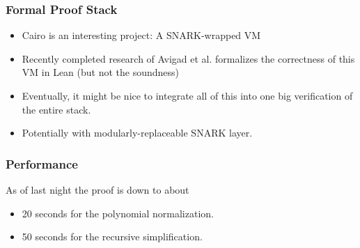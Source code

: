 \documentclass{beamer}
\begin{document}
\begin{frame}
    \frametitle{Formal Proof Stack}

    \begin{itemize}
        \item Cairo is an interesting project: A SNARK-wrapped VM

        \item Recently completed research of Avigad et al. formalizes the correctness of this VM in Lean (but not the soundness)
    
        \item Eventually, it might be nice to integrate all of this into one big verification of the entire stack. 
        
        \item Potentially with modularly-replaceable SNARK layer.
    \end{itemize}
     
\end{frame}

\begin{frame}

    \frametitle{Performance}

    As of last night the proof is down to about 
    
    \begin{itemize}
        \item 20 seconds for the polynomial normalization.
        \item 50 seconds for the recursive simplification.
    \end{itemize}





\end{frame}
\end{document}
